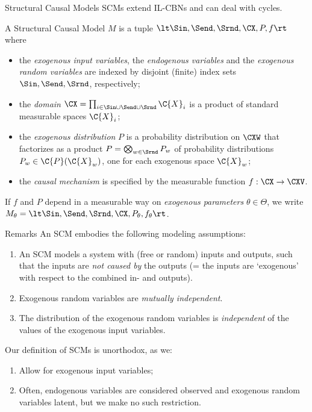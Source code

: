 \begin{frame}{Structural Causal Models}
  SCMs extend IL-CBNs and can deal with cycles.
  \begin{definition}
  A Structural Causal Model $M$ is a tuple $\lt \Sin, \Send, \Srnd, \CX, P, f \rt$ 
  where
  \begin{itemize}
    \item the \emph{exogenous input variables}, the \emph{endogenous variables} and the \emph{exogenous random variables} are indexed by disjoint (finite) index sets $\Sin, \Send, \Srnd$, respectively;
    \item the \emph{domain} $\CX = \prod_{i\in \Sin \cup \Send \cup \Srnd} \C{X}_i$ is a product of standard measurable spaces $\C{X}_i$;
    \item the \emph{exogenous distribution} $P$ is a probability distribution on $\CXW$ that factorizes as a product $P = \bigotimes_{w\in\Srnd} P_w$ of probability distributions $P_w \in \C{P}(\C{X}_w)$, one for each exogenous space $\C{X}_w$;
    \item the \emph{causal mechanism} is specified by the measurable function $f : \CX \to \CXV$.
  \end{itemize}
\end{definition}
If $f$ and $P$ depend in a measurable way on \emph{exogenous parameters} $\theta\in\Theta$, 
we write $M_{\theta} = \lt \Sin, \Send, \Srnd, \CX, P_{\theta}, f_{\theta} \rt$.
\end{frame}

\begin{frame}{Remarks}
  An SCM embodies the following modeling assumptions:
  \begin{enumerate}
    \item An SCM models a system with (free or random) inputs and outputs, such that the inputs are \emph{not caused by} the outputs (= the inputs are `exogenous' with respect to the combined in- and outputs).
    \item Exogenous random variables are \emph{mutually independent}.
    \item The distribution of the exogenous random variables is \emph{independent} of the values of the exogenous input variables.
  \end{enumerate}

  \bigskip
  Our definition of SCMs is unorthodox, as we:
  \begin{enumerate}
    \item Allow for exogenous input variables;
    \item Often, endogenous variables are considered observed and exogenous random variables latent,
      but we make no such restriction.
  \end{enumerate}
\end{frame}

